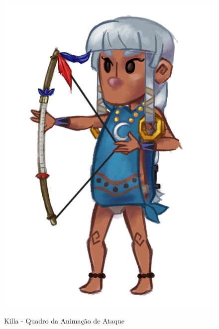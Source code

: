 \documentclass[12pt]{article}
\begin{document}
\begin{figure}[!htb]
    \centering
    \includegraphics[scale=0.2]{killa_attack.png}
    \label{fig:killa_attack}
    \caption{Killa - Quadro da Animação de Ataque}
\end{figure}
\end{document}
